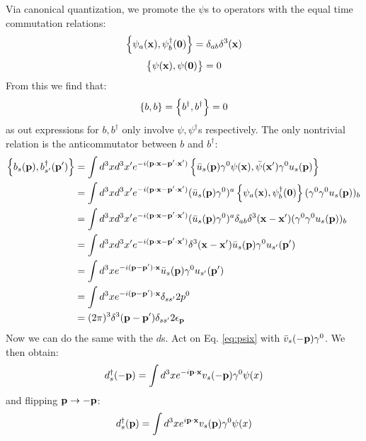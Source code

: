 Via canonical quantization, we promote the $\psi$s to operators with the equal time commutation relations:
\begin{equation}
    \set{\psi_a(\ensuremath{\mathbf{x}}), \psi^\dagger_b(\ensuremath{\mathbf{0}})} = \delta_{ab}\delta^3(\mathbf{x})
\end{equation}
\begin{equation}
    \set{\psi(\ensuremath{\mathbf{x}}), \psi(\ensuremath{\mathbf{0}})} = 0
\end{equation}
From this we find that:
\begin{equation}
    \set{b, b} = \set{b^\dagger, b^\dagger} = 0
\end{equation}
as out expressions for $b, b^\dag$ only involve $\psi, \psi^\dag$s respectively. The only nontrivial relation is the anticommutator between $b$ and $b^\dag$:
\begin{equation}
    \begin{split}
        \set{b_s(\ensuremath{\mathbf{p}}), b_{s'}^\dagger(\ensuremath{\mathbf{p}}')} &= \int d^3xd^3x' e^{-i(\mathbf{p}\cdot\mathbf{x} - \mathbf{p}'\cdot\mathbf{x}')}\set{\bar{u}_s(\ensuremath{\mathbf{p}})\gamma^0 \psi(\ensuremath{\mathbf{x}}), \bar{\psi}(\ensuremath{\mathbf{x}}')\gamma^0u_s(\ensuremath{\mathbf{p}})}
        \\ &= \int d^3xd^3x' e^{-i(\mathbf{p}\cdot\mathbf{x} - \mathbf{p}'\cdot\mathbf{x}')} (\bar{u}_s(\mathbf{p})\gamma^0)^a\set{\psi_a(\ensuremath{\mathbf{x}}), \psi^\dagger_b(\ensuremath{\mathbf{0}})}(\gamma^0\gamma^0u_s(\mathbf{p}))_b 
        \\ &= \int d^3xd^3x' e^{-i(\mathbf{p}\cdot\mathbf{x} - \mathbf{p}'\cdot\mathbf{x}')} (\bar{u}_s(\mathbf{p})\gamma^0)^a\delta_{ab}\delta^3(\mathbf{x}-\mathbf{x}')(\gamma^0\gamma^0u_s(\mathbf{p}))_b 
        \\ &= \int d^3xd^3x' e^{-i(\mathbf{p}\cdot\mathbf{x} - \mathbf{p}'\cdot\mathbf{x}')}\delta^3(\mathbf{x}-\mathbf{x}') \bar{u}_s(\mathbf{p})\gamma^0u_{s'}(\mathbf{p}')
        \\ &= \int d^3x e^{-i(\mathbf{p}-\mathbf{p}')\cdot\mathbf{x}} \bar{u}_s(\mathbf{p})\gamma^0u_{s'}(\mathbf{p}')
        \\ &= \int d^3x e^{-i(\mathbf{p}-\mathbf{p}')\cdot\mathbf{x}}  \delta_{ss'}2p^0
        \\ &= (2\pi)^3\delta^3(\mathbf{p}-\mathbf{p}')\delta_{ss'}2\epsilon_{\mathbf{p}}
    \end{split}
\end{equation}
Now we can do the same with the $d$s. Act on Eq. \eqref{eq:psix} with $\bar{v}_s(-\mathbf{p})\gamma^0$. We then obtain:
\begin{equation}
    d_s^\dagger(-\mathbf{p}) = \int d^3x e^{-i\mathbf{p}\cdot\mathbf{x}}v_s(-\mathbf{p})\gamma^0\psi(x)
\end{equation}
and flipping $\mathbf{p} \to -\mathbf{p}$:
\begin{equation}
    d_s^\dagger(\mathbf{p}) = \int d^3x e^{i\mathbf{p}\cdot\mathbf{x}}v_s(\mathbf{p})\gamma^0\psi(x)
\end{equation}
